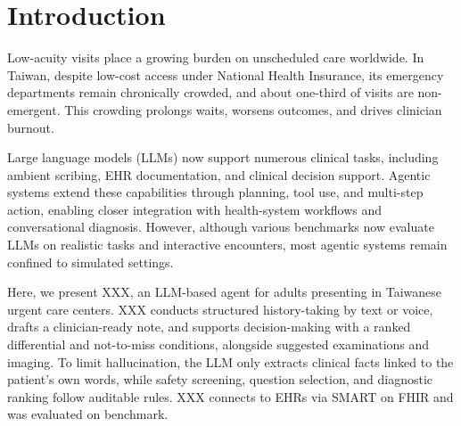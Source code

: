 \documentclass[lineno,pdflatex,sn-basic]{sn-jnl}%
\theoremstyle{thmstyleone}%
\theoremstyle{thmstyletwo}%
\theoremstyle{thmstylethree}%
\begin{document}



\maketitle

\section{Introduction}\label{sec1}

Low-acuity visits place a growing burden on unscheduled care worldwide.\cite{pinesInternationalPerspectivesEmergency2011} In Taiwan, despite low-cost access under National Health Insurance, its emergency departments remain chronically crowded, and about one-third of visits are non-emergent.\cite{huangCharacteristicsNonEmergentVisits2019} This crowding prolongs waits, worsens outcomes, and drives clinician burnout.\cite{morleyEmergencyDepartmentCrowding2018, ghaseminejadOrganisationalFactorsAssociated2025}

Large language models (LLMs) now support numerous clinical tasks, including ambient scribing, EHR documentation, and clinical decision support.\cite{nairCurrentStateDigital2026} Agentic systems extend these capabilities through planning, tool use, and multi-step action, enabling closer integration with health-system workflows and conversational diagnosis.\cite{tuConversationalDiagnosticArtificial2025} However, although various benchmarks now evaluate LLMs on realistic tasks and interactive encounters, most agentic systems remain confined to simulated settings.\cite{liuBenchmarkingLargeLanguage2026}

Here, we present XXX, an LLM-based agent for adults presenting in Taiwanese urgent care centers. XXX conducts structured history-taking by text or voice, drafts a clinician-ready note, and supports decision-making with a ranked differential and not-to-miss conditions, alongside suggested examinations and imaging. To limit hallucination, the LLM only extracts clinical facts linked to the patient's own words, while safety screening, question selection, and diagnostic ranking follow auditable rules. XXX connects to EHRs via SMART on FHIR and was evaluated on benchmark.




\end{document}
